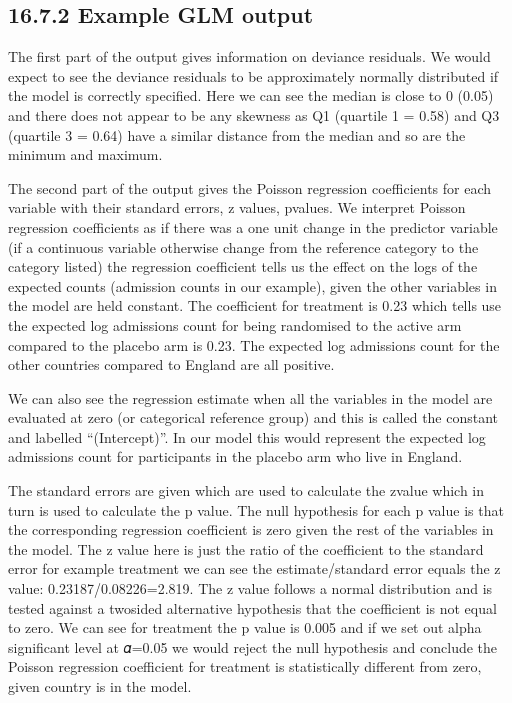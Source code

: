 \documentclass[letterpaper,10pt,english]{jupyterBook}
\begin{document}
\subsection{16.7.2 Example GLM output}
\label{\detokenize{16.h. Generalised Linear Model (GLM):example-glm-output}}
\sphinxAtStartPar
The first part of the output gives information on deviance residuals. We would expect to see the deviance residuals to be approximately normally distributed if the model is correctly specified. Here we can see the median is close to 0 (0.05) and there does not appear to be any skewness as Q1 (quartile 1 = \sphinxhyphen{}0.58) and Q3 (quartile 3 = 0.64) have a similar distance from the median and so are the minimum and maximum.

\sphinxAtStartPar
The second part of the output gives the Poisson regression coefficients for each variable with their standard errors, z values, p\sphinxhyphen{}values. We interpret Poisson regression coefficients as if there was a one unit change in the predictor variable (if a continuous variable otherwise change from the reference category to the category listed) the regression coefficient tells us the effect on the logs of the expected counts (admission counts in our example), given the other variables in the model are held constant. The coefficient for treatment is \sphinxhyphen{}0.23 which tells use the expected log admissions count for being randomised to the active arm compared to the placebo arm is \sphinxhyphen{}0.23. The expected log admissions count for the other countries compared to England are all positive.

\sphinxAtStartPar
We can also see the regression estimate when all the variables in the model are evaluated at zero (or categorical reference group) and this is called the constant and labelled “(Intercept)”. In our model this would represent the expected log admissions count for participants in the placebo arm who live in England.

\sphinxAtStartPar
The standard errors are given which are used to calculate the z\sphinxhyphen{}value which in turn is used to calculate the p value. The null hypothesis for each p value is that the corresponding regression coefficient is zero given the rest of the variables in the model. The z value here is just the ratio of the coefficient to the standard error for example treatment we can see the estimate/standard error equals the z value: \sphinxhyphen{}0.23187/0.08226=\sphinxhyphen{}2.819. The z value follows a normal distribution and is tested against a two\sphinxhyphen{}sided alternative hypothesis that the coefficient is not equal to zero. We can see for treatment the p value is 0.005 and if we set out alpha significant level at  𝛼=0.05  we would reject the null hypothesis and conclude the Poisson regression coefficient for treatment is statistically different from zero, given country is in the model.
\end{document}
